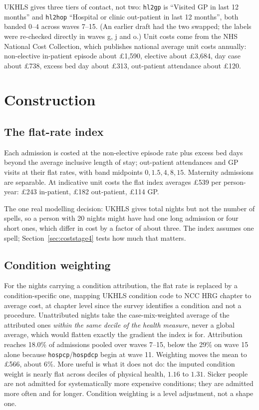 \documentclass[11pt]{article}
\newcommand{\code}[1]{\texttt{\small #1}}
\begin{document}
UKHLS gives three tiers of contact, not two: \code{hl2gp} is ``Visited GP in last 12 months'' and \code{hl2hop} ``Hospital or clinic out-patient in last 12 months'', both banded $0$--$4$ across waves 7--15. (An earlier draft had the two swapped; the labels were re-checked directly in waves g, j and o.) Unit costs come from the NHS National Cost Collection, which publishes national average unit costs annually: non-elective in-patient episode about \pounds1{,}590, elective about \pounds3{,}684, day case about \pounds738, excess bed day about \pounds313, out-patient attendance about \pounds120.

\section{Construction}

\subsection{The flat-rate index}
Each admission is costed at the non-elective episode rate plus excess bed days beyond the average inclusive length of stay; out-patient attendances and GP visits at their flat rates, with band midpoints $0, 1.5, 4, 8, 15$. Maternity admissions are separable. At indicative unit costs the flat index averages \pounds539 per person-year: \pounds243 in-patient, \pounds182 out-patient, \pounds114 GP.

The one real modelling decision: UKHLS gives total nights but not the number of spells, so a person with 20 nights might have had one long admission or four short ones, which differ in cost by a factor of about three. The index assumes one spell; Section~\ref{sec:coststage4} tests how much that matters.

\subsection{Condition weighting}
For the nights carrying a condition attribution, the flat rate is replaced by a condition-specific one, mapping UKHLS condition code to NCC HRG chapter to average cost, at chapter level since the survey identifies a condition and not a procedure. Unattributed nights take the case-mix-weighted average of the attributed ones \emph{within the same decile of the health measure}, never a global average, which would flatten exactly the gradient the index is for. Attribution reaches 18.0\% of admissions pooled over waves 7--15, below the 29\% on wave 15 alone because \code{hospcp}/\code{hospdcp} begin at wave 11. Weighting moves the mean to \pounds566, about 6\%. More useful is what it does not do: the imputed condition weight is nearly flat across deciles of physical health, $1.16$ to $1.31$. Sicker people are not admitted for systematically more expensive conditions; they are admitted more often and for longer. Condition weighting is a level adjustment, not a shape one.
\end{document}
